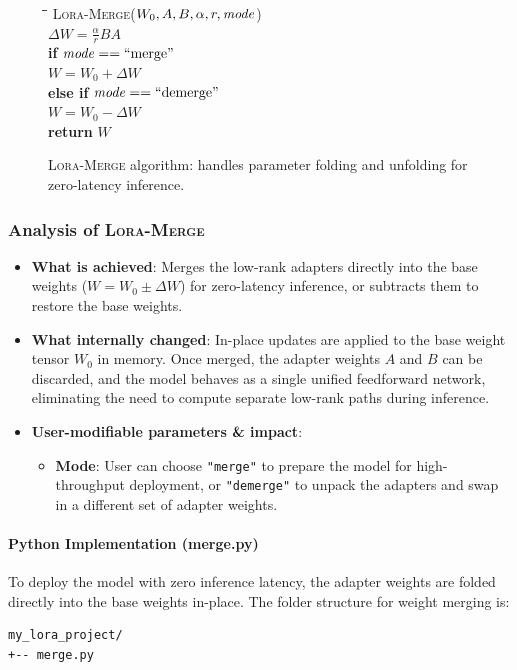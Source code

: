 \documentclass{article}
\begin{document}
\newpage

\begin{figure}[h]
\centering
\begin{minipage}{0.8\linewidth}
\begin{tabbing}
\quad \= \quad \= \quad \= \kill
\textsc{Lora-Merge}($W_0, A, B, \alpha, r, \text{\textit{mode}}$) \\
\> $\Delta W = \frac{\alpha}{r} B A$ \\
\> \textbf{if} $\text{\textit{mode}} == \text{``merge''}$ \\
\> \> $W = W_0 + \Delta W$ \\
\> \textbf{else if} $\text{\textit{mode}} == \text{``demerge''}$ \\
\> \> $W = W_0 - \Delta W$ \\
\> \textbf{return} $W$
\end{tabbing}
\end{minipage}
\caption{\textsc{Lora-Merge} algorithm: handles parameter folding and unfolding for zero-latency inference.}
\end{figure}

\subsubsection{Analysis of \textsc{Lora-Merge}}
\begin{itemize}
  \item \textbf{What is achieved}: Merges the low-rank adapters directly into the base weights ($W = W_0 \pm \Delta W$) for zero-latency inference, or subtracts them to restore the base weights.
  \item \textbf{What internally changed}: In-place updates are applied to the base weight tensor $W_0$ in memory. Once merged, the adapter weights $A$ and $B$ can be discarded, and the model behaves as a single unified feedforward network, eliminating the need to compute separate low-rank paths during inference.
  \item \textbf{User-modifiable parameters \& impact}:
    \begin{itemize}
      \item \textbf{Mode}: User can choose \texttt{"merge"} to prepare the model for high-throughput deployment, or \texttt{"demerge"} to unpack the adapters and swap in a different set of adapter weights.
    \end{itemize}
\end{itemize}

\paragraph{Python Implementation (merge.py)}
To deploy the model with zero inference latency, the adapter weights are folded directly into the base weights in-place. The folder structure for weight merging is:
\begin{verbatim}
my_lora_project/
+-- merge.py
\end{verbatim}
\end{document}

